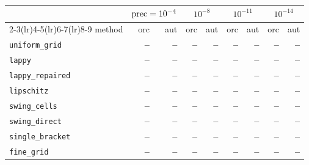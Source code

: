\begin{center}
\small
\begin{tabular}{lrrrrrrrr}
\toprule
& \multicolumn{2}{c}{$\mathrm{prec}=10^{-4}$} & \multicolumn{2}{c}{$10^{-8}$} & \multicolumn{2}{c}{$10^{-11}$} & \multicolumn{2}{c}{$10^{-14}$} \\
\cmidrule(lr){2-3}\cmidrule(lr){4-5}\cmidrule(lr){6-7}\cmidrule(lr){8-9}
method & orc & aut & orc & aut & orc & aut & orc & aut \\
\midrule
\texttt{uniform\_grid} & \textbf{--} & \textbf{--} & \textbf{--} & \textbf{--} & \textbf{--} & \textbf{--} & \textbf{--} & \textbf{--} \\
\texttt{lappy} & \textbf{--} & \textbf{--} & \textbf{--} & \textbf{--} & \textbf{--} & \textbf{--} & \textbf{--} & \textbf{--} \\
\texttt{lappy\_repaired} & \textbf{--} & \textbf{--} & \textbf{--} & \textbf{--} & \textbf{--} & \textbf{--} & \textbf{--} & \textbf{--} \\
\texttt{lipschitz} & \textbf{--} & \textbf{--} & \textbf{--} & \textbf{--} & \textbf{--} & \textbf{--} & \textbf{--} & \textbf{--} \\
\texttt{swing\_cells} & \textbf{--} & \textbf{--} & \textbf{--} & \textbf{--} & \textbf{--} & \textbf{--} & \textbf{--} & \textbf{--} \\
\texttt{swing\_direct} & \textbf{--} & \textbf{--} & \textbf{--} & \textbf{--} & \textbf{--} & \textbf{--} & \textbf{--} & \textbf{--} \\
\midrule
\texttt{single\_bracket} & \textbf{--} & \textbf{--} & \textbf{--} & \textbf{--} & \textbf{--} & \textbf{--} & \textbf{--} & \textbf{--} \\
\texttt{fine\_grid} & \textbf{--} & \textbf{--} & \textbf{--} & \textbf{--} & \textbf{--} & \textbf{--} & \textbf{--} & \textbf{--} \\
\bottomrule
\end{tabular}
\end{center}

